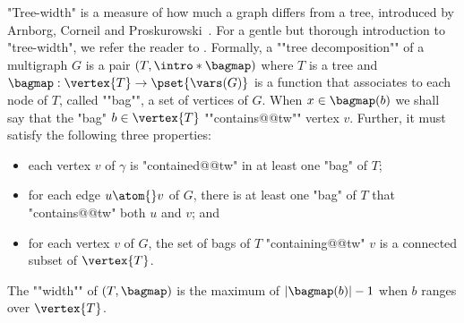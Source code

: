 \AP
"Tree-width" is a measure of how much a
graph differs from a tree, introduced by Arnborg, Corneil and
Proskurowski~\cite{ArnborgCorneilProskurowski1987Complexity}.
%
For a gentle but thorough introduction to "tree-width", we refer the reader to
\cite[\S 3.6]{NesetrilPOM2012Prolegomena}. Formally, a \AP""tree decomposition"" of a multigraph $G$ is a
pair $(T, \intro*\bagmap)$ where $T$ is a tree and $\bagmap: \vertex{T} \to \pset{\vars(G)}$ is a function that associates to each node of $T$, called \AP""bag"",
a set of vertices of $G$. When $x \in \bagmap(b)$ we shall say that the "bag"
$b \in \vertex{T}$ \AP""contains@@tw"" vertex $v$. Further, it must satisfy the following three properties:
\begin{itemize}
    \item each vertex $v$ of $\gamma$ is "contained@@tw" in at least one "bag" of $T$;
    \item for each edge $u \atom{} v$ of $G$, there is at least one "bag" of $T$
        that "contains@@tw" both $u$ and $v$; and 
    \item for each vertex $v$ of $G$, the set of bags of $T$ "containing@@tw" $v$ is a 
        connected subset of $\vertex{T}$.
\end{itemize}
The \AP""width"" of $(T, \bagmap)$ is the maximum of $|\bagmap(b)|-1$ when $b$ ranges over
$\vertex{T}$.

